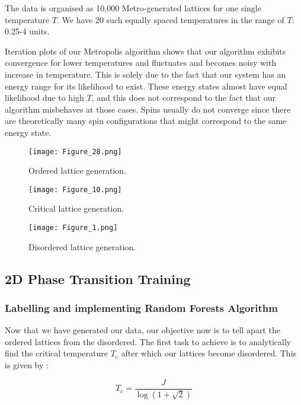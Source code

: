 The data is organised as 10,000 Metro-generated lattices for one single temperature $T$. We have 20 such equally spaced temperatures in the range of $T$: 0.25-4 units.

Iteration plots of our Metropolis algorithm shows that our algorithm exhibits convergence for lower temperatures and fluctuates and becomes noisy with increase in temperature.
This is solely due to the fact that our system has an energy range for its likelihood to exist.
These energy states almost have equal likelihood due to high $T$, and this does not correspond to the fact that our algorithm misbehaves at those cases.
Spins usually do not converge since there are theoretically many spin configurations that might correspond to the same energy state.

\begin{figure}[h!]
    \centering
    \texttt{[image: Figure\_28.png]}
    \caption{Ordered lattice generation.\protect\footnotemark}
\end{figure}


\begin{figure}[h!]
    \centering
    \texttt{[image: Figure\_10.png]}
    \caption{Critical lattice generation.}
\end{figure}

\begin{figure}[h!]
    \centering
    \texttt{[image: Figure\_1.png]}
    \caption{Disordered lattice generation.}
\end{figure}


\subsection{2D Phase Transition Training}

\subsubsection{Labelling and implementing Random Forests Algorithm}

Now that we have generated our data, our objective now is to tell apart the ordered lattices from the disordered. The first task to achieve is to analytically find the critical temperature $T_c$ after which our lattices become disordered. This is given by \cite{onsager1944crystal}:

\[T_c=\frac{J}{\log(1+\sqrt{2})}\]

